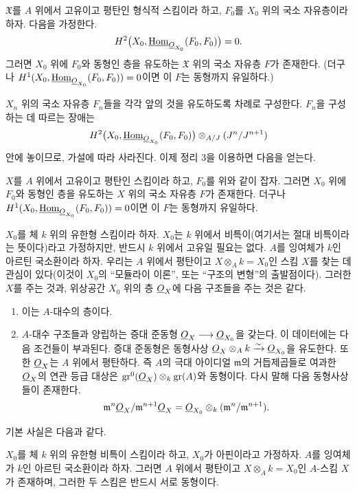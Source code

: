  $\mathfrak X$를 $A$ 위에서 고유이고 평탄인 형식적
스킴이라 하고, $F_0$를 $X_0$ 위의 국소 자유층이라 하자. 다음을 가정한다.
\[
  H^2\bigl(X_0,\underline{\operatorname{Hom}}_{\underline{O}_{X_0}}(F_0,F_0)\bigr)=0.
\]
그러면 $X_0$ 위에 $F_0$와 동형인 층을 유도하는 $\mathfrak X$ 위의 국소
자유층 $F$가 존재한다. (더구나
$H^1(X_0,\underline{\operatorname{Hom}}_{\underline{O}_{X_0}}(F_0,F_0))=0$이면 이 $F$는 동형까지
유일하다.)

$X_n$ 위의 국소 자유층 $F_n$들을 각각 앞의 것을 유도하도록 차례로
구성한다. $F_n$을 구성하는 데 따르는 장애는
\[
  H^2\bigl(X_0,\underline{\operatorname{Hom}}_{\underline{O}_{X_0}}(F_0,F_0)\bigr)
  \otimes_{A/J}(J^n/J^{n+1})
\]
안에 놓이므로, 가설에 따라 사라진다. 이제 정리 3을 이용하면 다음을 얻는다.

 $X$를 $A$ 위에서 고유이고 평탄인 스킴이라 하고,
$F_0$를 위와 같이 잡자. 그러면 $X_0$ 위에 $F_0$와 동형인 층을 유도하는
$X$ 위의 국소 자유층 $F$가 존재한다. 더구나
$H^1(X_0,\underline{\operatorname{Hom}}_{\underline{O}_{X_0}}(F_0,F_0))=0$이면 이 $F$는 동형까지
유일하다.

$X_0$를 체 $k$ 위의 유한형 스킴이라 하자. $X_0$는 $k$ 위에서
비특이(여기서는 절대 비특이라는 뜻이다)라고 가정하지만, 반드시 $k$ 위에서
고유일 필요는 없다. $A$를 잉여체가 $k$인 아르틴 국소환이라 하자. 우리는
$A$ 위에서 평탄이고
$X\otimes_A k=X_0$인 스킴 $X$를 찾는 데 관심이 있다(이것이 $X_0$의
``모듈라이 이론'', 또는 ``구조의 변형''의 출발점이다). 그러한 $X$를 주는
것과, 위상공간 $X_0$ 위의 층 $\underline{O}_X$에 다음 구조들을 주는 것은 같다.
\begin{enumerate}
  \item[\textit{i.}] 이는 $A$-대수의 층이다.
  \item[\textit{ii.}] $A$-대수 구조들과 양립하는 증대 준동형
    $\underline{O}_X\longrightarrow\underline{O}_{X_0}$을 갖는다. 이 데이터에는 다음 조건들이
    부과된다. 증대 준동형은 동형사상
    $\underline{O}_X\otimes_A k\xrightarrow{\sim}\underline{O}_{X_0}$을 유도한다. 또한
    $\underline{O}_X$는 $A$ 위에서 평탄하다. 즉 $A$의 극대 아이디얼
    $\mathfrak m$의 거듭제곱들로 여과한 $\underline{O}_X$의 연관 등급 대상은
    $\operatorname{gr}^0(\underline{O}_X)\otimes_k\operatorname{gr}(A)$와 동형이다.
    다시 말해 다음 동형사상들이 존재한다.
    \[
      \mathfrak m^n\underline{O}_X/\mathfrak m^{n+1}\underline{O}_X
      =\underline{O}_{X_0}\otimes_k(\mathfrak m^n/\mathfrak m^{n+1}).
    \]
\end{enumerate}
기본 사실은 다음과 같다.

 $X_0$를 체 $k$ 위의 유한형 비특이 스킴이라 하고,
$X_0$가 아핀이라고 가정하자. $A$를 잉여체가 $k$인 아르틴 국소환이라
하자. 그러면 $A$ 위에서 평탄이고 $X\otimes_A k=X_0$인 $A$-스킴 $X$가
존재하며, 그러한 두 스킴은 반드시 서로 동형이다.

